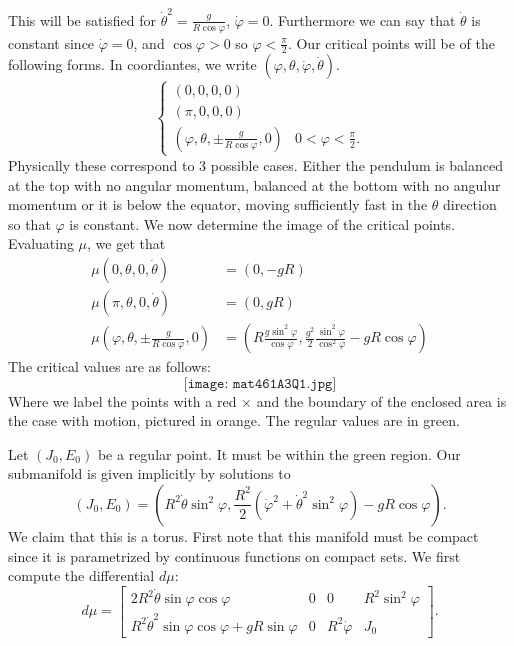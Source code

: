 \documentclass[12pt, a4paper]{article}
\theoremstyle{definition}
\newcommand{\bmat}[1]{\begin{bmatrix}#1\end{bmatrix}}
\begin{document}
This will be satisfied for $\dot{\theta}^2 = \frac{ g }{ R \cos \varphi }$, $\dot{\varphi} = 0$. Furthermore we can say that $\dot{\theta} $ is constant since $\dot{\varphi} = 0$, and $\cos{\varphi} >0$ so $\varphi < \frac{ \pi }{ 2 }$. 
Our critical points will be of the following forms. In coordiantes, we write $(\varphi, \theta, \dot{\varphi}, \dot \theta)$.
$$ \begin{cases} 
	\left( 0, 0, 0,0 \right)
	\\ \left( \pi, 0 ,0, 0 \right)
	\\  \left( \varphi, \theta, \pm \frac{ g }{ R \cos \varphi }, 0 \right) & \text{$0< \varphi < \frac{ \pi }{ 2 }$.} 
\end{cases} $$ 
Physically these correspond to 3 possible cases. Either the pendulum is balanced at the top with no angular momentum, balanced at the bottom with no angulur momentum or it is below the equator, moving sufficiently fast in the $\theta$ direction so that $\varphi$ is constant.  
We now determine the image of the critical points. Evaluating $\mu$, we get that 
\begin{align*}
	\mu \left( 0 , \theta , 0 ,\dot{\theta}  \right) & = \left( 0,- gR \right)
	\\ \mu \left( \pi, \theta, 0 ,\dot{\theta} \right) & = \left( 0, gR \right)
	\\ \mu \left( \varphi , \theta , \pm \frac{ g }{ R \cos \varphi  }, 0 \right) & = \left( R \frac{ g\sin^2 \varphi }{ \cos \varphi },  \frac{ g^2 }{ 2 }\frac{  \sin^2 \varphi  }{  \cos^2 \varphi} - gR \cos \varphi \right)
\end{align*}
The critical values are as follows:
$$ \texttt{[image: mat461A3Q1.jpg]} $$ 
Where we label the points with a red $\times$ and the boundary of the enclosed area is the case with motion, pictured in orange. The regular values are in green. 
\item Let $(J_0, E_0)$ be a regular point. It must be within the green region. Our submanifold is given implicitly by solutions to
	$$ (J_0, E_0 ) = \left( R^2 \dot{\theta} \sin^2 \varphi , \frac{ R^2 }{ 2 } \left( \dot{\varphi}^2  + \dot{\theta}^2 \sin^2 \varphi \right)  - gR \cos \varphi\right) .$$
We claim that this is a torus. First note that this manifold must be compact since it is parametrized by continuous functions on compact sets. We first compute the differential $d\mu$:
$$ d\mu = \bmat{2 R^2 \dot{\theta} \sin \varphi \cos \varphi & 0 & 0 & R^2 \sin^2 \varphi 
\\ R^2 \dot{\theta}^2 \sin \varphi \cos \varphi + gR \sin \varphi & 0 & R^2 \dot{\varphi} & J_0}.$$
\end{document}
